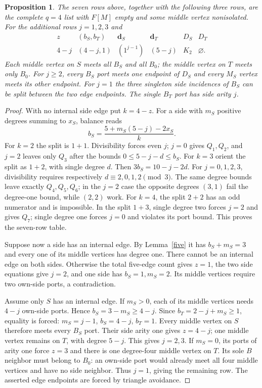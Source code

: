 \documentclass[11pt]{article}
\newtheorem{proposition}[theorem]{Proposition}
\begin{document}
\begin{proposition}\label{q4}
The seven rows above, together with the following three rows, are the
complete $q=4$ list with $F[M]$ empty and some middle vertex nonisolated.
For the additional rows $j=1,2,3$ and
\[
\begin{array}{c|c|c|c|c|c}
z&(b_S,b_T)&\mathbf d_S&\mathbf d_T&D_S&D_T\\\hline
4-j&(4-j,1)&(1^{j-1})&(5-j)&K_2&\varnothing.
\end{array}
\]
Each middle vertex on $S$ meets all $B_S$ and all $B_0$; the middle
vertex on $T$ meets only $B_0$. For $j\geq2$, every $B_S$ port meets
one endpoint of $D_S$ and every $M_S$ vertex meets its other endpoint.
For $j=1$ the three singleton side incidences of $B_S$ can be split
between the two edge endpoints. The single $B_T$ port has side arity $j$.
\end{proposition}
\begin{proof}
With no internal side edge put $k=4-z$. For a side with $m_S$ positive
degrees summing to $x_S$, balance reads
\[
 b_S=\frac{5+m_S(5-j)-2x_S}{k}.
\]
For $k=2$ the split is $1+1$. Divisibility forces even $j$;
$j=0$ gives $Q_1,Q_2$, and $j=2$ leaves only $Q_3$ after the bounds
$0\leq5-j-d\leq b_S$. For $k=3$ orient the split as $1+2$, with
single degree $d$. Then $3b_S=10-j-2d$. For $j=0,1,2,3$,
divisibility requires respectively $d\equiv2,0,1,2\pmod3$.
The same degree bounds leave exactly $Q_4,Q_5,Q_6$; in the $j=2$
case the opposite degrees $(3,1)$ fail the degree-one bound, while
$(2,2)$ work. For $k=4$, the split $2+2$ has an odd numerator and is
impossible. In the split $1+3$, single degree two forces $j=2$ and
gives $Q_7$; single degree one forces $j=0$ and violates its port bound.
This proves the seven-row table.

Suppose now a side has an internal edge. By Lemma~\ref{five} it has
$b_S+m_S=3$ and every one of its middle vertices has degree one.
There cannot be an internal edge on both sides. Otherwise the total
five-edge count gives $z=1$, the two side equations give $j=2$, and
one side has $b_S=1,m_S=2$. Its middle vertices require two own-side
ports, a contradiction.

Assume only $S$ has an internal edge. If $m_S>0$, each of its middle
vertices needs $4-j$ own-side ports. Hence
$b_S=3-m_S\geq4-j$. Since $b_T=2-j+m_S\geq1$, equality is forced:
$m_S=j-1$, $b_S=4-j$, $b_T=1$. Every middle vertex on $S$ therefore
meets every $B_S$ port. Their side arity one gives $z=4-j$; one
middle vertex remains on $T$, with degree $5-j$. This gives $j=2,3$.
If $m_S=0$, its ports of arity one force $z=3$ and there is one
degree-four middle vertex on $T$. Its sole $B$ neighbor must belong
to $B_0$: an own-side port would already meet all four middle vertices
and have no side neighbor. Thus $j=1$, giving the remaining row.
The asserted edge endpoints are forced by triangle avoidance.
\end{proof}
\end{document}
